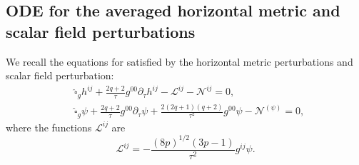 \documentclass{article}
\newcommand{\mc}{\mathcal}
\newcommand{\wh}{\widehat}
\newcommand{\pa}{\partial}
\begin{document}
\subsection{ODE for the averaged horizontal metric and scalar field perturbations}
We recall the equations for satisfied by the horizontal metric perturbations and scalar field perturbation:
\begin{align}
    &\wh{\square}_g  h^{ij} + \frac{2q+2}{\tau}g^{00}\pa_\tau  h^{ij} - \mc{L}^{ij} - \mc{N}^{ij}=0,\label{sec:gaugedeqs.eq:wavehorimeansection}\\
    &\wh{\square}_g \psi +\frac{2q+2}{\tau}g^{00}\pa_\tau \psi + \frac{2(2q+1)(q+2)}{\tau^2}g^{00}\psi - \mc{N}^{(\psi)}= 0,\label{sec:gaugedeqs.eq:wavescalarmeansection}
\end{align}
where the functions $\mc{L}^{ij}$ are
\begin{equation}
    \mc{L}^{ij} = -\frac{(8p)^{1/2}(3p-1)}{\tau^2}g^{ij}\psi.
\end{equation}
\end{document}
